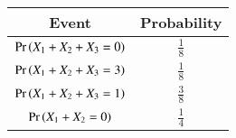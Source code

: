 
\begin{center}
\begin{tabular}{|c|c|}
\hline
\textbf{Event}& \textbf{Probability} \\ \hline
$\Pr\left(X_1 + X_2 + X_3 = 0\right)$ &  $\frac{1}{8}$ \\ \hline
$\Pr\left(X_1 + X_2 + X_3 = 3\right)$ &  $\frac{1}{8}$ \\ \hline
$\Pr\left(X_1 + X_2 + X_3 = 1\right)$ &  $\frac{3}{8}$ \\ \hline
$\Pr\left(X_1 + X_2 = 0\right)$ & 	$\frac{1}{4}$ \\ \hline
\end{tabular}
\end{center}
